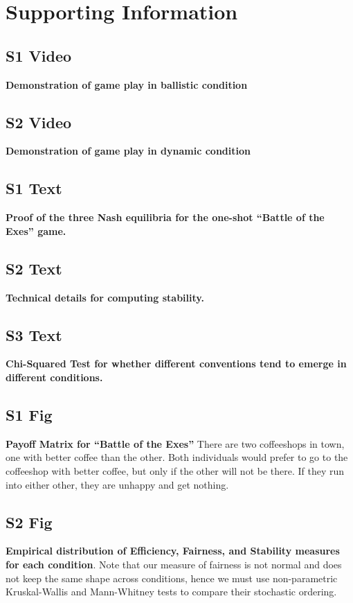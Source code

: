 \documentclass[10pt,letterpaper]{article}
\begin{document}
\section*{Supporting Information}

\subsection*{S1 Video}
\label{S1_Video}
{\bf Demonstration of game play in ballistic condition}

\subsection*{S2 Video}
\label{S2_Video}
{\bf Demonstration of game play in dynamic condition}

\subsection*{S1 Text}
\label{S1_Text}
{\bf Proof of the three Nash equilibria for the one-shot ``Battle of the Exes'' game.}  

\subsection*{S2 Text}
\label{S2_Text}
{\bf Technical details for computing stability.}

\subsection*{S3 Text}
\label{S3_Text}
{\bf Chi-Squared Test for whether different conventions tend to emerge in different conditions.}

\subsection*{S1 Fig}
\label{S1_Fig}
{\bf Payoff Matrix for ``Battle of the Exes''} There are two coffeeshops in town, one with better coffee than the other. Both individuals would prefer to go to the coffeeshop with better coffee, but only if the other will not be there. If they run into either other, they are unhappy and get nothing.

\subsection*{S2 Fig}
\label{S2_Fig}
{\bf Empirical distribution of Efficiency, Fairness, and Stability measures for each condition}. Note that our measure of fairness is not normal and does not keep the same shape across conditions, hence we must use non-parametric Kruskal-Wallis and Mann-Whitney tests to compare their stochastic ordering.
\end{document}
